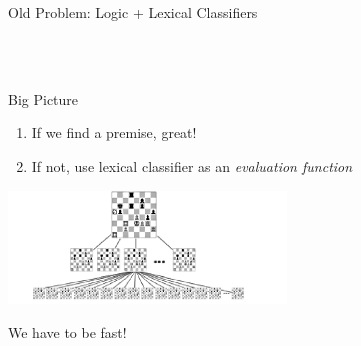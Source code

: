 \def\title{Old Problem: Logic + Lexical Classifiers}
\begin{frame}{\title}
\begin{center}
 \\
 \\
\vspace{2ex}
\end{center}
\end{frame}

\def\title{Big Picture}
\begin{frame}{\title}
\begin{enumerate}
\item If we find a premise, great!
\pause
\item If not, use lexical classifier as an \textit{evaluation function}
\end{enumerate}
\vspace{1ex}

\begin{center}
\includegraphics[height=3cm]{../img/chess.png}
\end{center}
\vspace{1ex}
\pause

 We have to be fast!
\end{frame}


